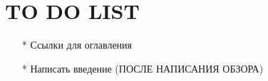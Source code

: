 
\section{TO DO LIST}

\begin{itemize}
    \item [*] Ссылки для оглавления
    \item [*] Написать введение (ПОСЛЕ НАПИСАНИЯ ОБЗОРА)
\end{itemize}